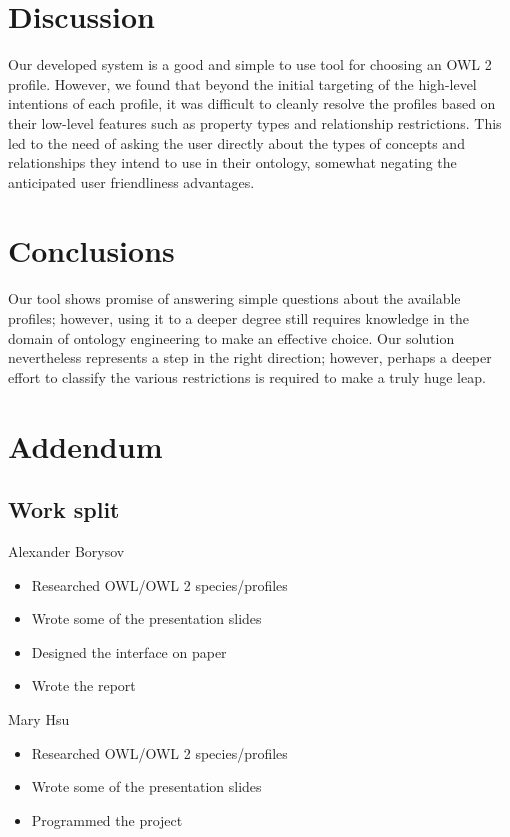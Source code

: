 \documentclass[a4paper,titlepage,11pt]{scrartcl}
\begin{document}
\section{Discussion}
Our developed system is a good and simple to use tool for choosing an OWL 2 profile. However, we found that beyond the initial targeting of the high-level intentions of each profile, it was difficult to cleanly resolve the profiles based on their low-level features such as property types and relationship restrictions. This led to the need of asking the user directly about the types of concepts and relationships they intend to use in their ontology, somewhat negating the anticipated user friendliness advantages.\\

\section{Conclusions}
Our tool shows promise of answering simple questions about the available profiles; however, using it to a deeper degree still requires knowledge in the domain of ontology engineering to make an effective choice. Our solution nevertheless represents a step in the right direction; however, perhaps a deeper effort to classify the various restrictions is required to make a truly huge leap.
\printbibliography
\section{Addendum}
\subsection*{Work split}
Alexander Borysov
\begin{itemize}
    \item{Researched OWL/OWL 2 species/profiles}
    \item{Wrote some of the presentation slides}
    \item{Designed the interface on paper}
    \item{Wrote the report}
\end{itemize}
Mary Hsu
\begin{itemize}
    \item{Researched OWL/OWL 2 species/profiles}
    \item{Wrote some of the presentation slides}
    \item{Programmed the project}
\end{itemize}
\end{document}
